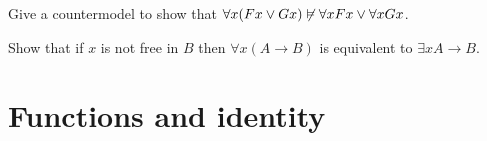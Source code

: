 
\begin{exercise}
  Give a countermodel to show that
  $\forall x (Fx \lor Gx) \not\vDash \forall x Fx \lor \forall x Gx$.
\end{exercise}

\begin{exercise}
  Show that if $x$ is not free in $B$ then
  $\forall x(A \to B)$ is equivalent to $\exists x A \to B$.
\end{exercise}








\section{Functions and identity}\label{sec:functions}

